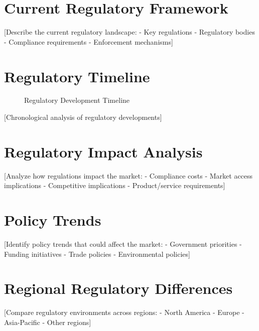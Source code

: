 \documentclass[11pt,letterpaper]{report}
\begin{document}
\section{Current Regulatory Framework}

[Describe the current regulatory landscape:
- Key regulations
- Regulatory bodies
- Compliance requirements
- Enforcement mechanisms]

\section{Regulatory Timeline}


\begin{figure}[htbp]
\centering
\caption{Regulatory Development Timeline}
\label{fig:regulatory_timeline}
\end{figure}

[Chronological analysis of regulatory developments]

\section{Regulatory Impact Analysis}

[Analyze how regulations impact the market:
- Compliance costs
- Market access implications
- Competitive implications
- Product/service requirements]

\section{Policy Trends}

[Identify policy trends that could affect the market:
- Government priorities
- Funding initiatives
- Trade policies
- Environmental policies]

\section{Regional Regulatory Differences}

[Compare regulatory environments across regions:
- North America
- Europe
- Asia-Pacific
- Other regions]
\end{document}
